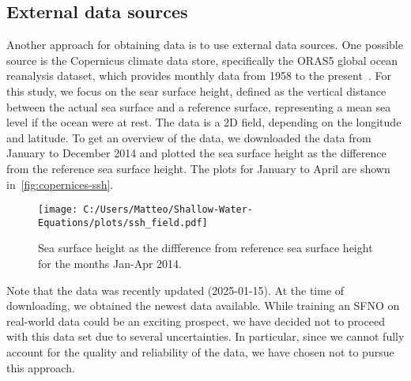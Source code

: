 \subsection*{External data sources}
Another approach for obtaining data is to use external data sources.
One possible source is the Copernicus climate data store, specifically the ORAS5 global ocean reanalysis dataset, which provides monthly data from 1958 to the present~\cite{Copernicus_data}.
For this study, we focus on the sear surface height, defined as the vertical distance between the actual sea surface and a reference surface, representing a mean sea level if the ocean were at rest.
The data is a 2D field, depending on the longitude and latitude.
To get an overview of the data, we downloaded the data from January to December 2014 and plotted the sea surface height as the difference from the reference sea surface height.
The plots for January to April are shown in~\autoref{fig:copernices-ssh}.
\begin{figure}[H]
    \centering
    \texttt{[image: C:/Users/Matteo/Shallow-Water-Equations/plots/ssh\_field.pdf]}
    \caption{Sea surface height as the diffference from reference sea surface height for the months Jan-Apr 2014.}\label{fig:copernices-ssh}
\end{figure}
Note that the data was recently updated (2025-01-15).
At the time of downloading, we obtained the newest data available.
While training an SFNO on real-world data could be an exciting prospect, we have decided not to proceed with this data set due to several uncertainties.
In particular, since we cannot fully account for the quality and reliability of the data, we have chosen not to pursue this approach.

